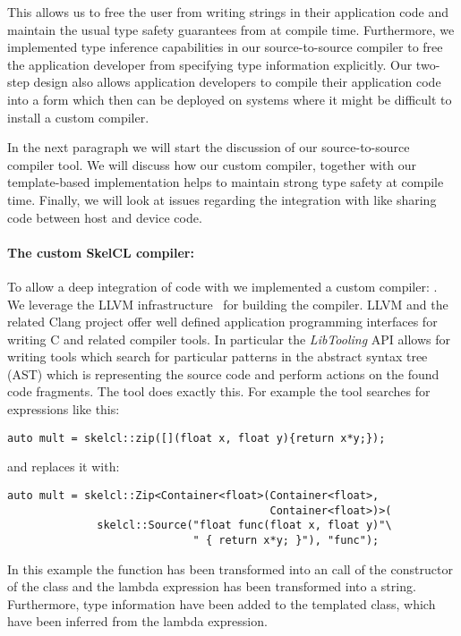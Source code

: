This allows us to free the user from writing strings in their application code and maintain the usual type safety guarantees from \Cpp at compile time.
Furthermore, we implemented type inference capabilities in our source-to-source compiler to free the application developer from specifying type information explicitly.
Our two-step design also allows application developers to compile their application code into a form which then can be deployed on systems where it might be difficult to install a custom compiler.

In the next paragraph we will start the discussion of our source-to-source compiler tool.
We will discuss how our custom compiler, together with our template-based implementation helps to maintain strong type safety at compile time.
Finally, we will look at issues regarding the integration with \Cpp like sharing code between host and device code.

\paragraph{The custom SkelCL compiler: }
To allow a deep integration of \SkelCL code with \Cpp we implemented a custom compiler: .
We leverage the LLVM infrastructure~\cite{Lattner2004} for building the compiler.
LLVM and the related Clang project offer well defined application programming interfaces for writing C and \Cpp related compiler tools.
In particular the \emph{LibTooling} API allows for writing tools which search for particular patterns in the abstract syntax tree (AST) which is representing the source code and perform actions on the found code fragments.
The  tool does exactly this.
For example the tool searches for expressions like this:
\begin{lstlisting}[numbers=none,label={lst:skelclc:before},caption={Code snippet before transformation.}]
auto mult = skelcl::zip([](float x, float y){return x*y;});
\end{lstlisting}
and replaces it with:
\begin{lstlisting}[numbers=none,label={lst:skelclc:after},caption={Code snippet after transformation.}]
auto mult = skelcl::Zip<Container<float>(Container<float>,
                                         Container<float>)>(
              skelcl::Source("float func(float x, float y)"\
                             " { return x*y; }"), "func");
\end{lstlisting}

In this example the  function has been transformed into an call of the constructor of the  class and the lambda expression has been transformed into a string.
Furthermore, type information have been added to the templated \code{Zip} class, which have been inferred from the lambda expression.


